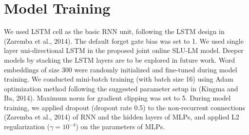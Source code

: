 \section{Model Training}
We used LSTM cell as the basic RNN unit, following the LSTM design in (Zaremba et al., 2014).
The default forget gate bias was set to 1. We used single layer uni-directional LSTM in the proposed
joint online SLU-LM model. Deeper models by stacking the LSTM layers are to be explored in future work. Word embeddings of size 300 were randomly initialized and fine-tuned during model training. We conducted mini-batch training (with batch size 16) using Adam optimization method following the suggested parameter setup in (Kingma and Ba, 2014). Maximum norm for gradient clipping was set to 5. During model training, we applied dropout (dropout rate 0.5) to the non-recurrent connections (Zaremba et al., 2014) of RNN and the hidden layers of MLPs, and applied L2 regularization ($\gamma = 10^{-4}$) on the parameters of MLPs. 
